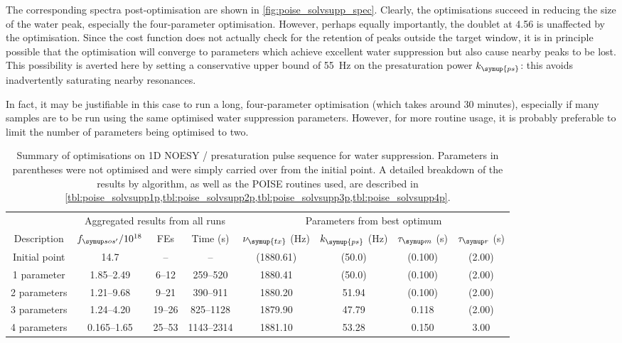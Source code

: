 The corresponding spectra post-optimisation are shown in \cref{fig:poise_solvsupp_spec}.
Clearly, the optimisations succeed in reducing the size of the water peak, especially the four-parameter optimisation.
However, perhaps equally importantly, the doublet at \qty{4.56}{\ppm} is unaffected by the optimisation.
Since the cost function does not actually check for the retention of peaks outside the target window, it is in principle possible that the optimisation will converge to parameters which achieve excellent water suppression but also cause nearby peaks to be lost.
This possibility is averted here by setting a conservative upper bound of \qty{55}{\Hz} on the presaturation power $k_{\symup{ps}}$: this avoids inadvertently saturating nearby resonances.

In fact, it may be justifiable in this case to run a long, four-parameter optimisation (which takes around 30 minutes), especially if many samples are to be run using the same optimised water suppression parameters.
However, for more routine usage, it is probably preferable to limit the number of parameters being optimised to two.


\begin{table}
    \centering
    \begin{tabular}{cccccccc}
        \toprule
         & \multicolumn{3}{c}{Aggregated results from all runs} & \multicolumn{4}{c}{Parameters from best optimum} \\
        Description & $\fsosre / 10^{18}$ & FEs & Time (\unit{\s}) & $\nu_{\symup{tx}}$ (\unit{\Hz}) & $k_{\symup{ps}}$ (\unit{\Hz}) & $\taum$ (\unit{\s}) & $\taur$ (\unit{\s}) \\
        \hline
        Initial point & 14.7         & --     & --         & (1880.61) & (50.0) & (0.100) & (2.00) \\
        1 parameter   & 1.85--2.49   & 6--12  & 259--520   & 1880.41   & (50.0) & (0.100) & (2.00) \\
        2 parameters  & 1.21--9.68   & 9--21  & 390--911   & 1880.20   & 51.94  & (0.100) & (2.00) \\
        3 parameters  & 1.24--4.20   & 19--26 & 825--1128  & 1879.90   & 47.79  & 0.118   & (2.00) \\
        4 parameters  & 0.165--1.65  & 25--53 & 1143--2314 & 1881.10   & 53.28  & 0.150   & 3.00 \\
        \hline
    \end{tabular}
    \caption[Overview of all water suppression optimisations]{
        Summary of optimisations on 1D NOESY / presaturation pulse sequence for water suppression.
        Parameters in parentheses were not optimised and were simply carried over from the initial point.
        A detailed breakdown of the results by algorithm, as well as the POISE routines used, are described in \cref{tbl:poise_solvsupp1p,tbl:poise_solvsupp2p,tbl:poise_solvsupp3p,tbl:poise_solvsupp4p}.
    }
    \label{tbl:poise_solvsupp_summary}
\end{table}

